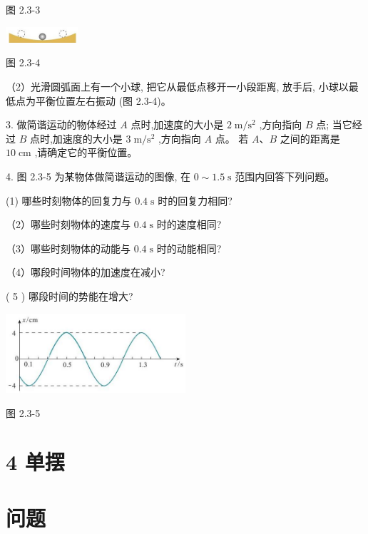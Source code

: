 \documentclass[10pt]{article}
\begin{document}
图 2.3-3

\begin{center}
\includegraphics[max width=0.2\textwidth]{images/01910e4c-ebb8-7d2c-8f2f-2375bc1d2d12_50_718341.jpg}
\end{center}

图 2.3-4

（2）光滑圆弧面上有一个小球, 把它从最低点移开一小段距离, 放手后, 小球以最低点为平衡位置左右振动 (图 2.3-4)。

3. 做简谐运动的物体经过 \(A\) 点时,加速度的大小是 \(2\mathrm{\;m}/{\mathrm{s}}^{2}\) ,方向指向 \(B\) 点; 当它经过 \(B\) 点时,加速度的大小是 \(3\mathrm{\;m}/{\mathrm{s}}^{2}\) ,方向指向 \(A\) 点。 若 \(A\text{、}B\) 之间的距离是 \({10}\mathrm{\;{cm}}\) ,请确定它的平衡位置。

4. 图 2.3-5 为某物体做简谐运动的图像, 在 \(0 \sim {1.5}\mathrm{\;s}\) 范围内回答下列问题。

(1) 哪些时刻物体的回复力与 \({0.4}\mathrm{\;s}\) 时的回复力相同?

（2）哪些时刻物体的速度与 \({0.4}\mathrm{\;s}\) 时的速度相同?

（3）哪些时刻物体的动能与 \({0.4}\mathrm{\;s}\) 时的动能相同?

（4）哪段时间物体的加速度在减小?

( 5 ) 哪段时间的势能在增大?

\begin{center}
\includegraphics[max width=0.5\textwidth]{images/01910e4c-ebb8-7d2c-8f2f-2375bc1d2d12_50_342481.jpg}
\end{center}

图 2.3-5

\section*{4 单摆}

\section*{问题}
\end{document}
